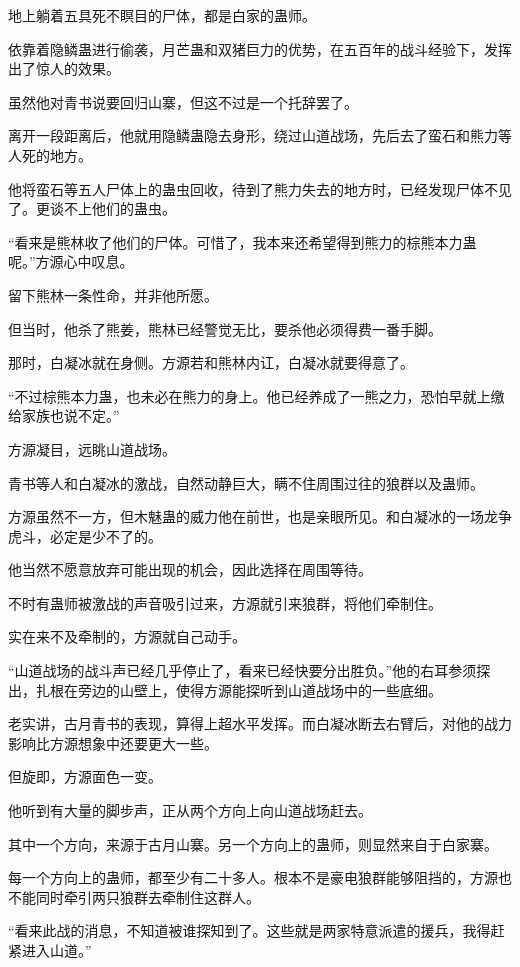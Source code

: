 \begin{this_body}
地上躺着五具死不瞑目的尸体，都是白家的蛊师。

依靠着隐鳞蛊进行偷袭，月芒蛊和双猪巨力的优势，在五百年的战斗经验下，发挥出了惊人的效果。

虽然他对青书说要回归山寨，但这不过是一个托辞罢了。

离开一段距离后，他就用隐鳞蛊隐去身形，绕过山道战场，先后去了蛮石和熊力等人死的地方。

他将蛮石等五人尸体上的蛊虫回收，待到了熊力失去的地方时，已经发现尸体不见了。更谈不上他们的蛊虫。

“看来是熊林收了他们的尸体。可惜了，我本来还希望得到熊力的棕熊本力蛊呢。”方源心中叹息。

留下熊林一条性命，并非他所愿。

但当时，他杀了熊姜，熊林已经警觉无比，要杀他必须得费一番手脚。

那时，白凝冰就在身侧。方源若和熊林内讧，白凝冰就要得意了。

“不过棕熊本力蛊，也未必在熊力的身上。他已经养成了一熊之力，恐怕早就上缴给家族也说不定。”

方源凝目，远眺山道战场。

青书等人和白凝冰的激战，自然动静巨大，瞒不住周围过往的狼群以及蛊师。

方源虽然不一方，但木魅蛊的威力他在前世，也是亲眼所见。和白凝冰的一场龙争虎斗，必定是少不了的。

他当然不愿意放弃可能出现的机会，因此选择在周围等待。

不时有蛊师被激战的声音吸引过来，方源就引来狼群，将他们牵制住。

实在来不及牵制的，方源就自己动手。

“山道战场的战斗声已经几乎停止了，看来已经快要分出胜负。”他的右耳参须探出，扎根在旁边的山壁上，使得方源能探听到山道战场中的一些底细。

老实讲，古月青书的表现，算得上超水平发挥。而白凝冰断去右臂后，对他的战力影响比方源想象中还要更大一些。

但旋即，方源面色一变。

他听到有大量的脚步声，正从两个方向上向山道战场赶去。

其中一个方向，来源于古月山寨。另一个方向上的蛊师，则显然来自于白家寨。

每一个方向上的蛊师，都至少有二十多人。根本不是豪电狼群能够阻挡的，方源也不能同时牵引两只狼群去牵制住这群人。

“看来此战的消息，不知道被谁探知到了。这些就是两家特意派遣的援兵，我得赶紧进入山道。”


\end{this_body}
